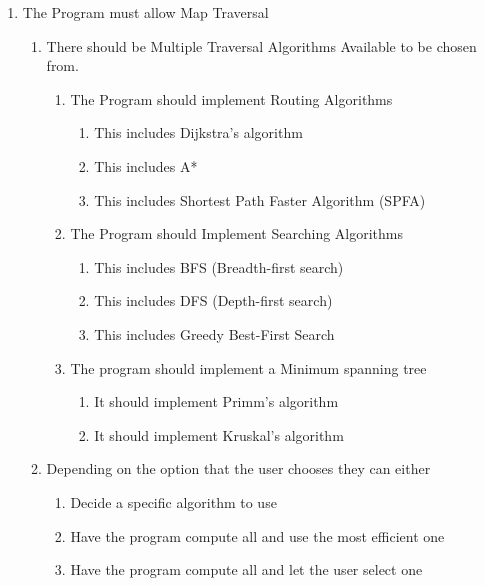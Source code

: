 \begin{flushleft}
\begin{enumerate}
            \item The Program must allow Map Traversal
            \begin{enumerate}
                \item There should be Multiple Traversal Algorithms Available to be chosen from.
                    \begin{enumerate}
                        \item The Program should implement Routing Algorithms 
                        \begin{enumerate}
                            \item This includes Dijkstra's algorithm
                            \item This includes A*
                            \item This includes Shortest Path Faster Algorithm (SPFA)
                        \end{enumerate}
                        \item The Program should Implement Searching Algorithms
                        \begin{enumerate}
                            \item This includes BFS (Breadth-first search)
                            \item This includes DFS (Depth-first search)
                            \item This includes Greedy Best-First Search
                        \end{enumerate}
                        \item The program should implement a Minimum spanning tree
                        \begin{enumerate}
                            \item It should implement Primm's algorithm
                            \item It should implement Kruskal's algorithm
                        \end{enumerate}
                    \end{enumerate}
                \item Depending on the option that the user chooses they can either
                \begin{enumerate}
                    \item Decide a specific algorithm to use
                    \item Have the program compute all and use the most efficient one
                    \item Have the program compute all and let the user select one
                \end{enumerate}
            \end{enumerate}
            

\end{enumerate}
\end{flushleft}
